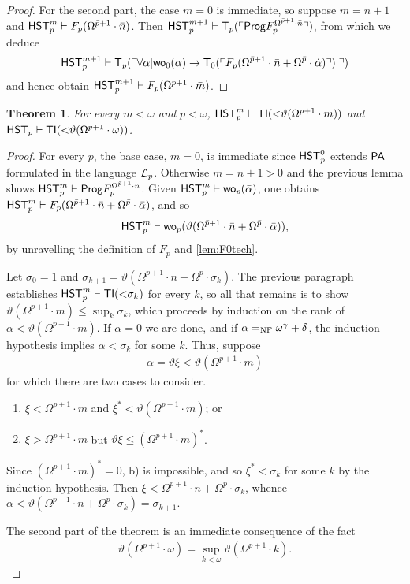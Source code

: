 \documentclass[UKenglish,cleveref,DIV=12]{scrartcl}
\newtheorem{theorem}{Theorem}[section]
\theoremstyle{definition}
\theoremstyle{definition}
\begin{document}
\begin{proof}
For the second part, the case $m=0$ is immediate, so suppose $m=n+1$ and $\mathsf{HST}_p^m\vdash
F_p(\Omega^{\bar p+1}\cdot\bar n)$. Then
$\mathsf{HST}_p^{m+1}\vdash\mathsf{T}_p(\ulcorner{\mathsf{Prog}F_p^{\Omega^{\bar p+1}\cdot\bar n}}\urcorner)$, from which we deduce
\begin{align*}
  \mathsf{HST}_p^{m+1}\vdash\mathsf{T}_p(\ulcorner{\forall\alpha[\mathsf{wo}_0(\alpha)\rightarrow\mathsf{T}_0(\ulcorner{F_p(\Omega^{\bar p+1}\cdot\bar n+\Omega^{\bar p}\cdot\dot\alpha)}\urcorner)]}\urcorner)
\end{align*}
and hence obtain $\mathsf{HST}_p^{m+1}\vdash F_p(\Omega^{\bar p+1}\cdot\bar m)$.
\end{proof}
\begin{theorem}\label{thm:Fplowerbound}
 For every $m<\omega$ and $p<\omega$,
$\mathsf{HST}_p^{m}\vdash\mathsf{TI}(\mathord<\vartheta(\Omega^{p+1}\cdot m))$ and
$\mathsf{HST}_p\vdash\mathsf{TI}(\mathord<\vartheta(\Omega^{p+1}\cdot\omega))$.
\end{theorem}
\begin{proof}
For every $p$, the base case, $m=0$, is immediate since $\mathsf{HST}_p^0$ extends $\mathsf{PA}$
formulated in the language $\mathcal{L}_p$. Otherwise $m=n+1>0$ and the previous lemma
shows $\mathsf{HST}_p^m\vdash\mathsf{Prog} F_p^{\Omega^{\bar p+1}\cdot\bar n}$. Given $\mathsf{HST}_p^m\vdash
\mathsf{wo}_p(\bar \alpha)$, one obtains $\mathsf{HST}_p^m\vdash F_p(\Omega^{\bar p+1}\cdot\bar
n+\Omega^{\bar p}\cdot\bar\alpha)$, and so
\begin{align*}
  \mathsf{HST}_p^m\vdash\mathsf{wo}_p(\vartheta(\Omega^{\bar p+1}\cdot\bar n+\Omega^{\bar p}\cdot\bar\alpha)),
\end{align*}
by unravelling the definition of $F_p$ and \cref{lem:F0tech}.

Let $\sigma_0=1$ and $\sigma_{k+1}=\vartheta(\Omega^{p+1}\cdot
n+\Omega^p\cdot\sigma_k)$. The previous paragraph establishes $\mathsf{HST}_p^m\vdash
\mathsf{TI}(\mathord<\sigma_k)$ for every $k$, so all that remains is to show
$\vartheta(\Omega^{p+1}\cdot m)\le\sup_k\sigma_k$, which proceeds by induction
on the rank of $\alpha<\vartheta(\Omega^{p+1}\cdot m)$. If $\alpha=0$ we are
done, and if $\alpha=_{\mathrm{NF}}\omega^\gamma+\delta$, the induction hypothesis implies
$\alpha<\sigma_k$ for some $k$. Thus, suppose
\begin{gather*}
  \alpha=\vartheta\xi<\vartheta(\Omega^{p+1}\cdot m)
\end{gather*}
for which there are two cases to consider.
\begin{enumerate}
 \item $\xi<\Omega^{p+1}\cdot m$ and $\xi^*<\vartheta(\Omega^{p+1}\cdot m)$; or
 \item $\xi>\Omega^{p+1}\cdot m$ but $\vartheta\xi\le(\Omega^{p+1}\cdot m)^*$.
\end{enumerate}
Since $(\Omega^{p+1}\cdot m)^*=0$, b) is impossible, and so
$\xi^*<\sigma_k$ for some $k$ by the induction hypothesis. Then
$\xi<\Omega^{p+1}\cdot n+\Omega^p\cdot\sigma_k$, whence
$\alpha<\vartheta(\Omega^{p+1}\cdot n+\Omega^p\cdot\sigma_k)=\sigma_{k+1}$.

The second part of the theorem is an immediate consequence of the fact
\begin{align*}
  \vartheta(\Omega^{p+1}\cdot \omega)=\sup_{k<\omega}\vartheta(\Omega^{p+1}\cdot k).
\end{align*}
\end{proof}
\end{document}
